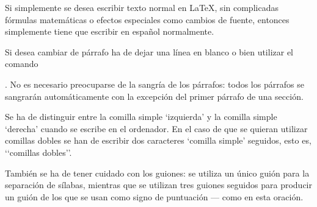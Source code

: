 \documentclass[a4paper,10pt]{letter}
\begin{document}
 Si simplemente se desea escribir texto normal en LaTeX,
 sin complicadas f\'ormulas matem\'aticas o efectos especiales 
 como cambios de fuente, entonces simplemente tiene que escribir
 en espa\~nol normalmente.\par
 Si desea cambiar de p\'arrafo ha de dejar una línea en blanco o bien
 utilizar el comando \par.
 No es necesario preocuparse de la sangría de los párrafos:
 todos los párrafos se sangrarán automáticamente con la excepción
 del primer párrafo de una sección.

 Se ha de distinguir entre la comilla simple ‘izquierda’
 y la comilla simple ‘derecha’ cuando se escribe en el ordenador.
 En el caso de que se quieran utilizar comillas dobles se han de
 escribir dos caracteres ‘comilla simple’ seguidos, esto es,
 ‘‘comillas dobles’’.

 También se ha de tener cuidado con los guiones: se utiliza un único
 guión para la separación de sílabas, mientras que se utilizan
 tres guiones seguidos para producir un guión de los que se usan
 como signo de puntuación --- como en esta oración.
\end{document}
